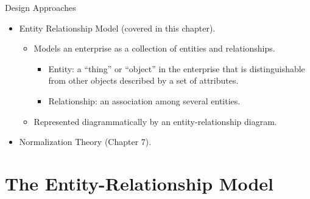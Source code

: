 \documentclass{beamer}
\begin{document}
\begin{frame}{Design Approaches}
    \begin{itemize}
        \item Entity Relationship Model (covered in this chapter).
        \begin{itemize}
            \item Models an enterprise as a collection of entities and relationships.
            \begin{itemize}
                \item Entity: a ``thing'' or ``object'' in the enterprise that is distinguishable from other objects described by a set of attributes.
                \item Relationship: an association among several entities.
            \end{itemize}
            \item Represented diagrammatically by an entity-relationship diagram.
        \end{itemize}
        \item Normalization Theory (Chapter 7).
    \end{itemize}
\end{frame}

\section{The Entity-Relationship Model}
\end{document}
